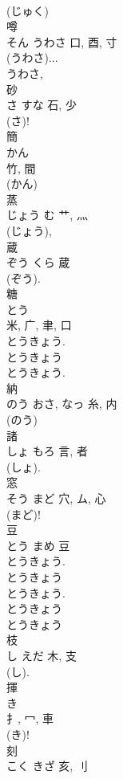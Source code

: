 \documentclass[8pt]{extreport}
\begin{document}
\begin{CJK}{UTF8}{min}
\\	(じゅく) 
\\	噂	
\\	そん	うわさ	口, 酉, 寸		
\\	(うわさ)...
\\	うわさ, 
\\	砂	
\\	さ	すな	石, 少	
\\	(さ)! 
\\	簡	
\\	かん	
\\	竹, 間	
\\	(かん) 
\\	蒸	
\\	じょう	む	艹, 灬		
\\	(じょう), 
\\	蔵	
\\	ぞう	くら	蔵	
\\	(ぞう).	
\\	糖	
\\	とう	
\\	米, 广, 聿, 口	
\\	とうきょう. 
\\	とうきょう 
\\	とうきょう. 
\\	納	
\\	のう	おさ, なっ	糸, 内	
\\	(のう) 
\\	諸	
\\	しょ	もろ	言, 者	
\\	(しょ). 
\\	窓	
\\	そう	まど	穴, ム, 心	
\\	(まど)! 
\\	豆	
\\	とう	まめ	豆	
\\	とうきょう. 
\\	とうきょう 
\\	とうきょう. 
\\	とうきょう 
\\	とうきょう 
\\	枝	
\\	し	えだ	木, 支	
\\	(し). 
\\	揮	
\\	き	
\\	扌, 冖, 車	
\\	(き)! 
\\	刻	
\\	こく	きざ	亥, 刂	

\end{CJK}
\end{document}
